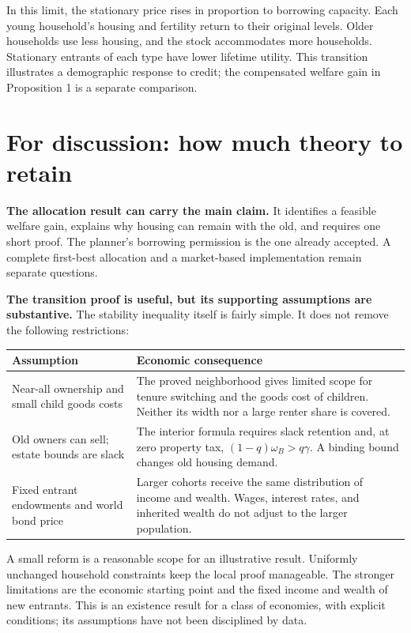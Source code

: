 \documentclass[11pt]{article}
\begin{document}
In this limit, the stationary price rises in proportion to borrowing capacity.
Each young household's housing and fertility return to their original levels.
Older households use less housing, and the stock accommodates more households.
Stationary entrants of each type have lower lifetime utility. This transition
illustrates a demographic response to credit; the compensated welfare gain
in Proposition 1 is a separate comparison.

\newpage
\section*{For discussion: how much theory to retain}

\textbf{The allocation result can carry the main claim.} It identifies a
feasible welfare gain, explains why housing can remain with the old, and
requires one short proof. The planner's borrowing permission is the one
already accepted. A complete first-best allocation and a market-based
implementation remain separate questions.

\textbf{The transition proof is useful, but its supporting assumptions are
substantive.} The stability inequality itself is fairly simple. It does not
remove the following restrictions:

\renewcommand{\arraystretch}{1.2}
\begin{tabularx}{\textwidth}{@{}p{}X@{}}
\toprule
Assumption & Economic consequence\\
\midrule
Near-all ownership and small child goods costs
& The proved neighborhood gives limited scope for tenure switching and the
goods cost of children. Neither its width nor a large renter share is covered.\\
Old owners can sell; estate bounds are slack
& The interior formula requires slack retention and, at zero property tax,
$(1-q)\omega_B>q\gamma$. A binding bound changes old housing demand.\\
Fixed entrant endowments and world bond price
& Larger cohorts receive the same distribution of income and wealth. Wages,
interest rates, and inherited wealth do not adjust to the larger population.\\
\bottomrule
\end{tabularx}

A small reform is a reasonable scope for an illustrative result. Uniformly
unchanged household constraints keep the local proof manageable. The stronger
limitations are the economic starting point and the fixed income and wealth
of new entrants. This is an existence result for a class of economies, with
explicit conditions; its assumptions have not been disciplined by data.
\end{document}
